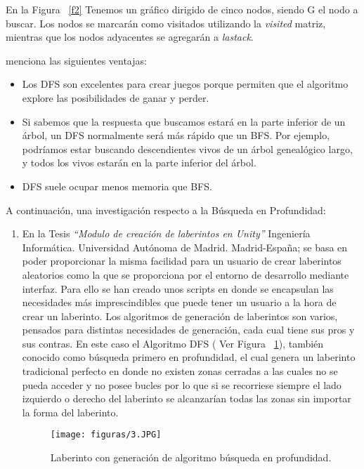 \documentclass[10pt,conference]{IEEEtran}
\begin{document}
En la Figura ~\ref{f2} Tenemos un gráfico dirigido de cinco nodos, siendo G el nodo a buscar. Los nodos se marcarán como visitados utilizando la \textit{visited} matriz, mientras que los nodos adyacentes se agregarán a \textit{lastack}.


\citep{ventajasamplitud} menciona las siguientes ventajas:
\begin{itemize}
    \item Los DFS son excelentes para crear juegos porque permiten que el algoritmo explore las posibilidades de ganar y perder.
    \item Si sabemos que la respuesta que buscamos estará en la parte inferior de un árbol, un DFS normalmente será más rápido que un BFS. Por ejemplo, podríamos estar buscando descendientes vivos de un árbol genealógico largo, y todos los vivos estarán en la parte inferior del árbol.
    \item DFS suele ocupar menos memoria que BFS.
\end{itemize}

A continuación, una investigación respecto a la Búsqueda en Profundidad:
\begin{enumerate}
\item En la Tesis \textit{“Modulo de creación de laberintos en Unity”} Ingeniería Informática. Universidad Autónoma de Madrid. Madrid-España; \citep{montero} se basa en poder proporcionar la misma facilidad para un usuario de crear laberintos aleatorios como la que se proporciona por el entorno de desarrollo mediante interfaz. Para ello se han creado unos scripts en donde se encapsulan las necesidades más imprescindibles que puede tener un usuario a la hora de crear un laberinto. Los algoritmos de generación de laberintos son varios, pensados para distintas necesidades de generación, cada cual tiene sus pros y sus contras. En este caso el Algoritmo DFS ( Ver Figura ~\ref{f3}), también conocido como búsqueda primero en profundidad, el cual genera un laberinto tradicional perfecto en donde no existen zonas cerradas a las cuales no se pueda acceder y no posee bucles por lo que si se recorriese siempre el lado izquierdo o derecho del laberinto se alcanzarían todas las zonas sin importar la forma del laberinto.
\begin{figure}[H]
 \begin{center}
       \texttt{[image: figuras/3.JPG]}
      \caption{Laberinto con generación de algoritmo búsqueda en profundidad.}
      \label{f3} 
      \end{center}
\end{figure}
\end{enumerate}
\end{document}
